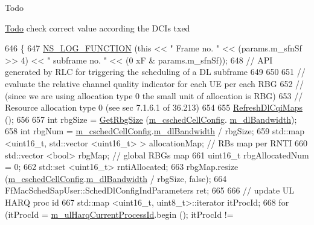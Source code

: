 \begin{DoxyRefDesc}{Todo}
\item[\hyperlink{todo__todo000135}{Todo}]check correct value according the D\+C\+Is txed \end{DoxyRefDesc}

\begin{DoxyCode}
646 \{
647   \hyperlink{log-macros-disabled_8h_a90b90d5bad1f39cb1b64923ea94c0761}{NS\_LOG\_FUNCTION} (\textcolor{keyword}{this} << \textcolor{stringliteral}{" Frame no. "} << (params.m\_sfnSf >> 4) << \textcolor{stringliteral}{" subframe no. "} << (0
      xF & params.m\_sfnSf));
648   \textcolor{comment}{// API generated by RLC for triggering the scheduling of a DL subframe}
649 
650 
651   \textcolor{comment}{// evaluate the relative channel quality indicator for each UE per each RBG}
652   \textcolor{comment}{// (since we are using allocation type 0 the small unit of allocation is RBG)}
653   \textcolor{comment}{// Resource allocation type 0 (see sec 7.1.6.1 of 36.213)}
654 
655   \hyperlink{classns3_1_1TdBetFfMacScheduler_a7b16f92e532fbd06ee099933b0f57a8c}{RefreshDlCqiMaps} ();
656 
657   \textcolor{keywordtype}{int} rbgSize = \hyperlink{classns3_1_1TdBetFfMacScheduler_a180d1d16bb6d0a4f9fcda5df9842ec4a}{GetRbgSize} (\hyperlink{classns3_1_1TdBetFfMacScheduler_a3e53aae0259501332769cd6ca4b74800}{m\_cschedCellConfig}.
      \hyperlink{structns3_1_1FfMacCschedSapProvider_1_1CschedCellConfigReqParameters_ad18c695bd3c9d7f742ba1dab4a941e8a}{m\_dlBandwidth});
658   \textcolor{keywordtype}{int} rbgNum = \hyperlink{classns3_1_1TdBetFfMacScheduler_a3e53aae0259501332769cd6ca4b74800}{m\_cschedCellConfig}.\hyperlink{structns3_1_1FfMacCschedSapProvider_1_1CschedCellConfigReqParameters_ad18c695bd3c9d7f742ba1dab4a941e8a}{m\_dlBandwidth} / rbgSize;
659   std::map <uint16\_t, std::vector <uint16\_t> > allocationMap; \textcolor{comment}{// RBs map per RNTI}
660   std::vector <bool> rbgMap;  \textcolor{comment}{// global RBGs map}
661   uint16\_t rbgAllocatedNum = 0;
662   std::set <uint16\_t> rntiAllocated;
663   rbgMap.resize (\hyperlink{classns3_1_1TdBetFfMacScheduler_a3e53aae0259501332769cd6ca4b74800}{m\_cschedCellConfig}.\hyperlink{structns3_1_1FfMacCschedSapProvider_1_1CschedCellConfigReqParameters_ad18c695bd3c9d7f742ba1dab4a941e8a}{m\_dlBandwidth} / rbgSize, \textcolor{keyword}{false});
664   FfMacSchedSapUser::SchedDlConfigIndParameters ret;
665 
666   \textcolor{comment}{//   update UL HARQ proc id}
667   std::map <uint16\_t, uint8\_t>::iterator itProcId;
668   \textcolor{keywordflow}{for} (itProcId = \hyperlink{classns3_1_1TdBetFfMacScheduler_a0776a2fc3f7186d7ec4491dc21706596}{m\_ulHarqCurrentProcessId}.begin (); itProcId != 

\end{DoxyCode}
